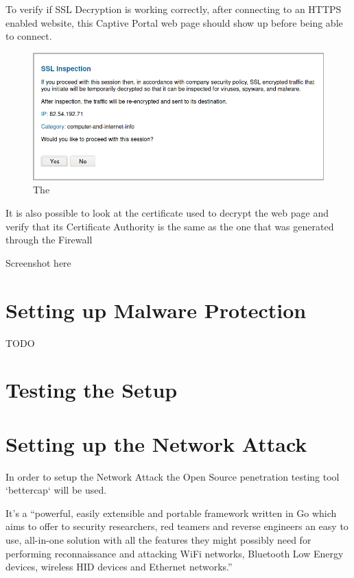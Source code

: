 \newpage

To verify if SSL Decryption is working correctly, after connecting to an HTTPS enabled website, this Captive Portal web page should show up before being able to connect.

\begin{figure}[!h]
\centering
 \includegraphics[width=13cm]{img/ssl_inspection_result.png}
	\caption{The }\label{SSL Inspection Page}
\end{figure}

It is also possible to look at the certificate used to decrypt the web page and verify that its Certificate Authority is the same as the one that was generated through the Firewall

Screenshot here

\newpage

\section{Setting up Malware Protection}

TODO

\section{Testing the Setup}

\newpage

\section{Setting up the Network Attack}

In order to setup the Network Attack the Open Source penetration testing tool `bettercap` will be used.

It's a ``powerful, easily extensible and portable framework written in Go which aims to offer to security researchers, red teamers and reverse engineers an easy to use, all-in-one solution with all the features they might possibly need for performing reconnaissance and attacking WiFi networks, Bluetooth Low Energy devices, wireless HID devices and Ethernet networks.''\cite{bettercap}

